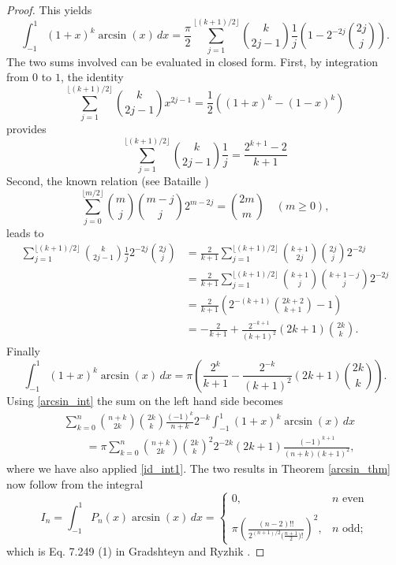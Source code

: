 \documentclass[11pt,reqno]{amsart}
\theoremstyle{plain}
\numberwithin{equation}{section}
\begin{document}
\begin{proof}
This yields
\begin{equation*}
\int_{-1}^1 (1+x)^k\arcsin(x)\,dx = \frac{\pi}{2} \sum_{j=1}^{\lfloor (k+1)/2 \rfloor} \binom{k}{2j-1} \frac{1}{j} \left (1-2^{-2j}\binom{2j}{j}\right ).
\end{equation*}
The two sums involved can be evaluated in closed form. First, by integration from $0$ to $1$, the identity 
$$\sum\limits_{j=1}^{\lfloor (k+1)/2 \rfloor}\binom{k}{2j-1} x^{2j-1}=\frac{1}{2}((1+x)^k-(1-x)^k)$$ 
provides
$$\sum_{j=1}^{\lfloor (k+1)/2 \rfloor} \binom{k}{2j-1} \frac{1}{j} = \frac{2^{k+1}-2}{k+1}$$
Second, the known relation (see Bataille \cite{Bat})
\[\sum_{j=0}^{\lfloor{m/2}\rfloor}\binom{m}{j}\binom{m-j}{j}2^{m-2j}=\binom{2m}{m}\quad (m\ge 0),\]
leads to
\begin{align*}
\sum_{j=1}^{\lfloor (k+1)/2 \rfloor} \binom{k}{2j-1} \frac{1}{j} 2^{-2j} \binom{2j}{j} 
&= \frac{2}{k+1}\sum_{j=1}^{\lfloor (k+1)/2 \rfloor} \binom{k+1}{2j}\binom{2j}{j}2^{-2j} \\
&= \frac{2}{k+1}\sum_{j=1}^{\lfloor (k+1)/2 \rfloor} \binom{k+1}{j}\binom{k+1-j}{j}2^{-2j} \\
&= \frac{2}{k+1}\left(2^{-(k+1)}\binom{2k+2}{k+1}-1\right) \\
&= - \frac{2}{k+1} + \frac{2^{-k+1}}{(k+1)^2} (2k+1) \binom{2k}{k}.
\end{align*}
Finally
\begin{equation}\label{arcsin_int}
\int_{-1}^1 (1+x)^k\arcsin(x)\,dx = \pi \left ( \frac{2^k}{k+1} - \frac{2^{-k}}{(k+1)^2} (2k+1) \binom{2k}{k} \right ).
\end{equation}
Using \eqref{arcsin_int} the sum on the left hand side becomes
\begin{align*}
& \sum_{k=0}^n \binom{n+k}{2k} \binom{2k}{k} \frac{(-1)^k}{n+k} 2^{-k} \int_{-1}^1 (1+x)^k\arcsin(x)\,dx \\
&\qquad = \pi \sum_{k=0}^{n} \binom{n+k}{2k} \binom{2k}{k}^2 2^{-2k} (2k+1) \frac{(-1)^{k+1}}{(n+k)(k+1)^2},
\end{align*}
where we have also applied \eqref{id_int1}. The two results in Theorem \ref{arcsin_thm} now follow from the integral
\begin{equation*}
I_n = \int_{-1}^1 P_n(x) \arcsin(x)\,dx = \begin{cases}
0, & n \,\,\text{even} \\ 
 &  \\
\pi \left (\frac{(n-2)!!}{2^{(n+1)/2}\big (\frac{n+1}{2}\big )!}\right )^2, & n \,\,\text{odd};
\end{cases} 
\end{equation*}
which is Eq. 7.249 (1) in Gradshteyn and Ryzhik \cite{GrRy07}.
\end{proof}
\end{document}

